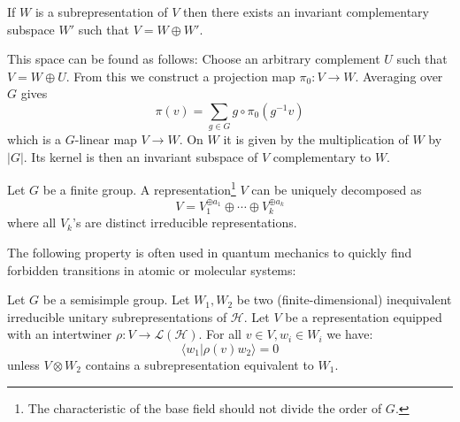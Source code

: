         \begin{property}
        	If $W$ is a subrepresentation of $V$ then there exists an invariant complementary subspace $W'$ such that $V = W \oplus W'$.
            
            This space can be found as follows: Choose an arbitrary complement $U$ such that $V = W \oplus U$. From this we construct a projection map $\pi_0:V \rightarrow W$. Averaging over $G$ gives
            \begin{equation}
            	\pi(v) = \sum_{g\in G}g\circ\pi_0(g^{-1}v)
            \end{equation}
            which is a $G$-linear map $V\rightarrow W$. On $W$ it is given by the multiplication of $W$ by $|G|$. Its kernel is then an invariant subspace of $V$ complementary to $W$.
        \end{property}
        \begin{theorem}[Maschke]
        	Let $G$ be a finite group. A representation\footnote{The characteristic of the base field should not divide the order of $G$.} $V$ can be uniquely decomposed as
		\begin{equation}
	            	V = V_1^{\oplus a_1}\oplus\cdots\oplus V_k^{\oplus a_k}
		\end{equation}
		where all $V_k$'s are distinct irreducible representations.
        \end{theorem}
        
        The following property is often used in quantum mechanics to quickly find forbidden transitions in atomic or molecular systems:
        \begin{property}
        	Let $G$ be a semisimple group. Let $W_1, W_2$ be two (finite-dimensional) inequivalent irreducible unitary subrepresentations of $\mathcal{H}$. Let $V$ be a representation equipped with an intertwiner $\rho:V\rightarrow\mathcal{L}(\mathcal{H})$. For all $v\in V, w_i\in W_i$ we have:
        	\begin{equation}
        		\langle w_1|\rho(v)w_2\rangle = 0
        	\end{equation}
        	unless $V\otimes W_2$ contains a subrepresentation equivalent to $W_1$.
        \end{property}
